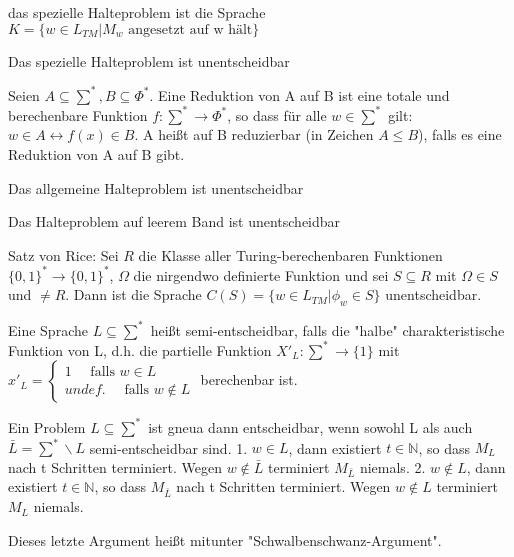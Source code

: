 \documentclass[avery5371]{flashcards}
\begin{document}
\begin{flashcard}[Definition]{ das spezielle Halteproblem ist die Sprache }$K=\{w\in L_{TM} | M_w \text{ angesetzt auf w hält}\}$
\end{flashcard}

\begin{flashcard}[Satz]{} Das spezielle Halteproblem ist unentscheidbar
\end{flashcard}

\begin{flashcard}[Definition]{} Seien $A\subseteq\sum^*,B\subseteq\Phi^*$. Eine Reduktion von A auf B ist eine totale und berechenbare Funktion $f:\sum^*\rightarrow\Phi^*$, so dass für alle $w\in\sum^*$ gilt: $w\in A\leftrightarrow f(x)\in B$. A heißt auf B reduzierbar (in Zeichen $A\leq B$), falls es eine Reduktion von A auf B gibt.
\end{flashcard}

\begin{flashcard}[Satz]{} Das allgemeine Halteproblem ist unentscheidbar
\end{flashcard}

\begin{flashcard}[Satz]{} Das Halteproblem auf leerem Band ist unentscheidbar
\end{flashcard}

\begin{flashcard}[Satz]{} Satz  von Rice: Sei $R$ die Klasse aller Turing-berechenbaren Funktionen $\{0,1\}^*\rightarrow\{0,1\}^*$, $\Omega$ die nirgendwo definierte Funktion und sei $S\subseteq R$ mit $\Omega\in S$ und $\not = R$. Dann ist die Sprache $C(S)=\{w\in L_{TM} | \phi_w\in S\}$ unentscheidbar.
\end{flashcard}

\begin{flashcard}[Definition]{} Eine Sprache $L\subseteq \sum^*$ heißt semi-entscheidbar, falls die "halbe" charakteristische Funktion von L, d.h. die partielle Funktion $X'_L:\sum^* \rightarrow \{1\}$ mit $x'_L=\begin{cases} 1 \quad\text{ falls } w\in L\\ undef. \quad\text{ falls } w\not\in L \end{cases}$ berechenbar ist.
\end{flashcard}

\begin{flashcard}[Satz]{} Ein Problem $L\subseteq \sum^*$ ist gneua dann entscheidbar, wenn sowohl L als auch $\bar{L}=\sum^*\backslash L$ semi-entscheidbar sind.
1. $w\in L$, dann existiert $t\in\mathbb{N}$, so dass $M_L$ nach t Schritten terminiert. Wegen $w\not\in\bar{L}$ terminiert $M_{\bar{L}}$ niemals.
2. $w\not\in L$, dann existiert $t\in\mathbb{N}$, so dass $M_{\bar{L}}$ nach t Schritten terminiert. Wegen $w\not\in L$ terminiert $M_L$ niemals.

Dieses letzte Argument heißt mitunter "Schwalbenschwanz-Argument".
\end{flashcard}
\end{document}
